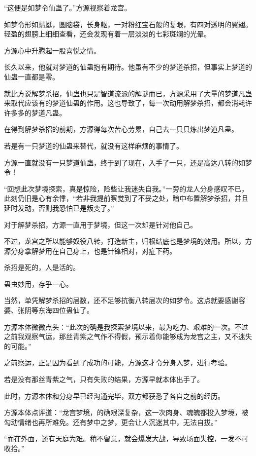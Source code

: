 
\begin{this_body}

“这便是如梦令仙蛊了。”方源视察着龙宫。

如梦令形如蜻蜓，圆脑袋，长身躯，一对粉红宝石般的复眼，有四对透明的翼翅。轻盈的翅膀上细细查看，还会发现有着一层淡淡的七彩斑斓的光晕。

方源心中升腾起一股喜悦之情。

长久以来，他就对梦道的仙蛊抱有期待。他虽有不少的梦道杀招，但事实上梦道的仙蛊一直都是零。

就比方说解梦杀招，仙蛊也只是智道流派的解谜而已，方源采用了大量的梦道凡蛊来取代应该有的梦道仙蛊的作用。这也导致了，每一次动用解梦杀招，都会消耗许许多多的梦道凡蛊。

在得到解梦杀招的前期，方源得每次苦心劳累，自己去一只只炼出梦道凡蛊。

若是有一只梦道的仙蛊来替代，就没有这样麻烦的事情了。

方源一直就没有一只梦道仙蛊，终于到了现在，入手了一只，还是高达八转的如梦令！

“回想此次梦境探索，真是惊险，险些让我迷失自我。”一旁的龙人分身感叹不已，此刻仍旧是心有余悸，“若非我提前察觉到了不妥之处，暗中布置解梦杀招，并且延时发动，否则我恐怕已是叛变了。”

对于解梦杀招，方源一直用于梦境，但这一次却是针对他自己。

不过，龙宫之所以能够奴役八转，打造新主，归根结底也是梦境的效用。所以，方源分身拿解梦用在自己身上，也是针锋相对，对症下药。

杀招是死的，人是活的。

蛊虫妙用，存乎一心。

当然，单凭解梦杀招的层数，还不足够抗衡八转层次的如梦令。这点就要感谢容婆、张阴等东海四位蛊仙了。

方源本体微微点头：“此次的确是我探索梦境以来，最为吃力、艰难的一次。不过之前我观察气运，那丝青紫之气作不得假，预示着你能够成为龙宫之主，又不迷失的可能。”

之前察运，正是因为看到了成功的可能，方源这才令分身入梦，进行考验。

若是没有那丝青紫之气，只有失败的结果，方源早就本体出手了。

此时，方源本体和分身早已经沟通完毕，双方都获悉了各自之前的经历。

方源本体点评道：“龙宫梦境，的确艰深复杂，这一次肉身、魂魄都投入梦境，被勾动情绪也再所难免。还有梦中之梦，更会让人沉迷其中，无法自拔。”

“而在外面，还有天庭为难。稍不留意，就会爆发大战，导致场面失控，一发不可收拾。”


\end{this_body}
